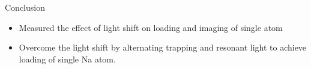 \documentclass{beamer}
\begin{document}
\begin{frame}
\begin{columns}
\begin{center}
    \end{center}
  \end{columns}
\end{frame}

\begin{frame}[t]{Conclusion}
  \begin{itemize}
  \item Measured the effect of light shift on loading and imaging of single atom
  \item Overcome the light shift by alternating trapping and resonant light to achieve loading of single Na atom.
  \end{itemize}
\end{frame}
\end{document}
